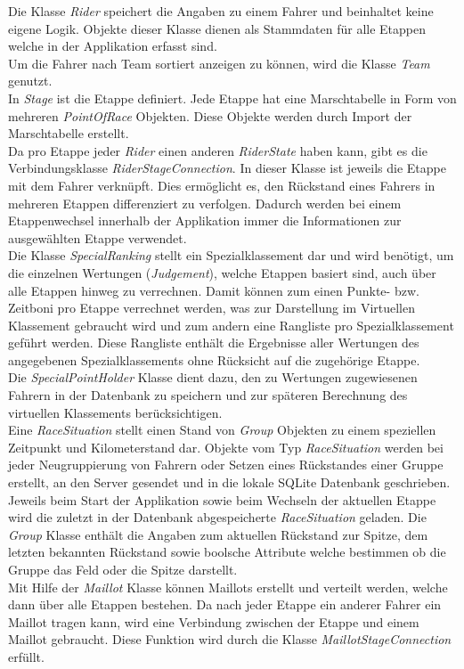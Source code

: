 Die Klasse \textit{Rider} speichert die Angaben zu einem Fahrer und beinhaltet keine eigene Logik. Objekte dieser Klasse dienen als Stammdaten für alle Etappen welche in der Applikation erfasst sind.\\
Um die Fahrer nach Team sortiert anzeigen zu können, wird die Klasse \textit{Team} genutzt.\\
In \textit{Stage} ist die Etappe definiert. Jede Etappe hat eine Marschtabelle in Form von mehreren \textit{PointOfRace} Objekten. Diese Objekte werden durch Import der Marschtabelle erstellt.\\
Da pro Etappe jeder \textit{Rider} einen anderen \textit{RiderState} haben kann, gibt es die Verbindungsklasse \textit{RiderStageConnection}. In dieser Klasse ist jeweils die Etappe mit dem Fahrer verknüpft. Dies ermöglicht es, den Rückstand eines Fahrers in mehreren Etappen differenziert zu verfolgen. Dadurch werden bei einem Etappenwechsel innerhalb der Applikation immer die Informationen zur ausgewählten Etappe verwendet.\\
Die Klasse \textit{SpecialRanking} stellt ein Spezialklassement dar und wird benötigt, um die einzelnen Wertungen (\textit{Judgement}), welche Etappen basiert sind, auch über alle Etappen hinweg zu verrechnen. Damit können zum einen Punkte- bzw. Zeitboni pro Etappe verrechnet werden, was zur Darstellung im Virtuellen Klassement gebraucht wird und zum andern eine Rangliste pro Spezialklassement geführt werden. Diese Rangliste enthält die Ergebnisse aller Wertungen des angegebenen Spezialklassements ohne Rücksicht auf die zugehörige Etappe.\\
Die \textit{SpecialPointHolder} Klasse dient dazu, den zu Wertungen zugewiesenen Fahrern in der Datenbank zu speichern und zur späteren Berechnung des virtuellen Klassements berücksichtigen.\\
Eine \textit{RaceSituation} stellt einen Stand von \textit{Group} Objekten zu einem speziellen Zeitpunkt und Kilometerstand dar. Objekte vom Typ \textit{RaceSituation} werden bei jeder Neugruppierung von Fahrern oder Setzen eines Rückstandes einer Gruppe erstellt, an den Server gesendet und in die lokale SQLite Datenbank geschrieben. Jeweils beim Start der Applikation sowie beim Wechseln der aktuellen Etappe wird die zuletzt in der Datenbank abgespeicherte \textit{RaceSituation} geladen. Die \textit{Group} Klasse enthält die Angaben zum aktuellen Rückstand zur Spitze, dem letzten bekannten Rückstand sowie boolsche Attribute welche bestimmen ob die Gruppe das Feld oder die Spitze darstellt.\\
Mit Hilfe der \textit{Maillot} Klasse können Maillots erstellt und verteilt werden, welche dann über alle Etappen bestehen. Da nach jeder Etappe ein anderer Fahrer ein Maillot tragen kann, wird eine Verbindung zwischen der Etappe und einem Maillot gebraucht. Diese Funktion wird durch die Klasse \textit{MaillotStageConnection} erfüllt. 


